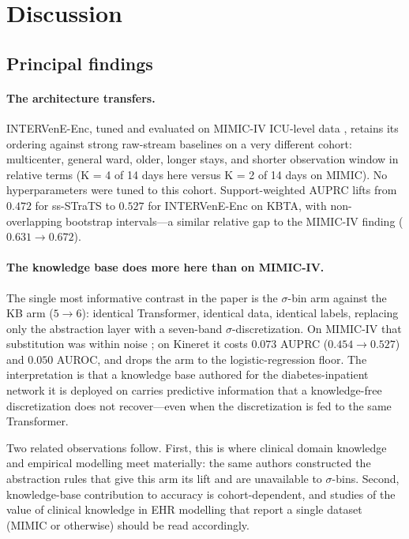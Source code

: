 \section{Discussion}
\label{sec:discussion}

\subsection{Principal findings}

\paragraph{The architecture transfers.}
INTERVenE-Enc, tuned and evaluated on MIMIC-IV ICU-level data
\citep{oded2026intervene}, retains its ordering against strong raw-stream
baselines on a very different cohort: multicenter, general ward, older,
longer stays, and shorter observation window in relative terms (K = 4 of
14 days here versus K = 2 of 14 days on MIMIC). No hyperparameters were
tuned to this cohort. Support-weighted AUPRC lifts from $0.472$ for
ss-STraTS to $0.527$ for INTERVenE-Enc on KBTA, with non-overlapping
bootstrap intervals---a similar relative gap to the MIMIC-IV finding
($0.631 \to 0.672$).

\paragraph{The knowledge base does more here than on MIMIC-IV.}
The single most informative contrast in the paper is the $\sigma$-bin
arm against the KB arm ($5 \to 6$): identical Transformer, identical
data, identical labels, replacing only the abstraction layer with a
seven-band $\sigma$-discretization. On MIMIC-IV that substitution was
within noise \citep{oded2026intervene}; on Kineret it costs $0.073$
AUPRC ($0.454 \to 0.527$) and $0.050$ AUROC, and drops the arm to the
logistic-regression floor. The interpretation is that a knowledge base
authored for the diabetes-inpatient network it is deployed on carries
predictive information that a knowledge-free discretization does not
recover---even when the discretization is fed to the same
Transformer.

Two related observations follow. First, this is where clinical domain
knowledge and empirical modelling meet materially: the same authors
constructed the abstraction rules \citep{hochberg2023inpatient} that
give this arm its lift and are unavailable to $\sigma$-bins. Second,
knowledge-base contribution to accuracy is cohort-dependent, and
studies of the value of clinical knowledge in EHR modelling that
report a single dataset (MIMIC or otherwise) should be read
accordingly.

